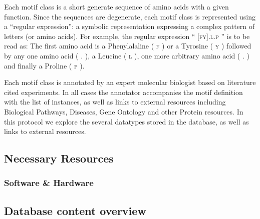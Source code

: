 \documentclass[12pt]{article}
\newcounter{proto}
\newcommand\motif[1]{%
    \textsc{\lowercase{#1}}%
}
\begin{document}
Each motif class is a short generate sequence of amino acids with a given
function. Since the sequences are degenerate, each motif class is represented
using a ``regular expression'': a symbolic representation expressing a complex
pattern of letters (or amino acids). For example, the regular expression
``\motif{[FY].L.P}'' is to be read as: The first amino acid is a Phenylalaline (\motif{F}) or a
Tyrosine (\motif{Y}) followed by any one amino acid (\motif{.}), a Leucine (\motif{L}), one more
arbitrary amino acid (\motif{.}) and finally a Proline (\motif{P}).

Each motif class is annotated by an expert molecular biologist based on
literature cited experiments.
In all cases the annotator accompanies the motif definition with the list of
instances, as well as links to external resources including Biological
Pathways, Diseases, Gene Ontology and other Protein resources. In this protocol
we explore the several datatypes stored in the database, as well as links to
external resources.

%
%
\subsection*{Necessary Resources}
\subsubsection*{Software \& Hardware}



%
%
\subsection{Database content overview}%
\label{subsec:explore_content_database}%
\end{document}
